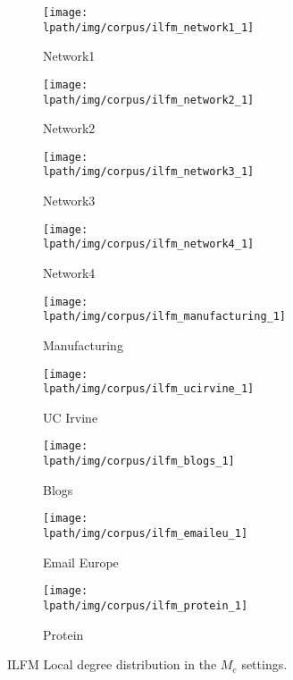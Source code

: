 
\begin{figure}[h]
        \centering
        \begin{subfigure}[b]{0.300\textwidth}
            \centering
            \texttt{[image: \\lpath/img/corpus/ilfm\_network1\_1]}
            \caption {{\small Network1}}    
        \end{subfigure}
        \begin{subfigure}[b]{0.300\textwidth}
            \centering
            \texttt{[image: \\lpath/img/corpus/ilfm\_network2\_1]}
            \caption {{\small Network2}}    
        \end{subfigure}
        \begin{subfigure}[b]{0.300\textwidth}
            \centering
            \texttt{[image: \\lpath/img/corpus/ilfm\_network3\_1]}
            \caption {{\small Network3}}    
        \end{subfigure}
        \begin{subfigure}[b]{0.300\textwidth}
            \centering
            \texttt{[image: \\lpath/img/corpus/ilfm\_network4\_1]}
            \caption {{\small Network4}}    
        \end{subfigure}
        \begin{subfigure}[b]{0.300\textwidth}
            \centering
            \texttt{[image: \\lpath/img/corpus/ilfm\_manufacturing\_1]}
            \caption {{\small Manufacturing}}    
        \end{subfigure}
        \begin{subfigure}[b]{0.300\textwidth}
            \centering
            \texttt{[image: \\lpath/img/corpus/ilfm\_ucirvine\_1]}
            \caption {{\small UC Irvine}}    
            \label{fig:mean and std of net14}
        \end{subfigure}
        \begin{subfigure}[b]{0.300\textwidth}
            \centering
            \texttt{[image: \\lpath/img/corpus/ilfm\_blogs\_1]}
            \caption {{\small Blogs}}    
            \label{fig:mean and std of net14}
        \end{subfigure}
        \begin{subfigure}[b]{0.300\textwidth}
            \centering
            \texttt{[image: \\lpath/img/corpus/ilfm\_emaileu\_1]}
            \caption {{\small Email Europe}}    
            \label{fig:mean and std of net14}
        \end{subfigure}
        \begin{subfigure}[b]{0.300\textwidth}
            \centering
            \texttt{[image: \\lpath/img/corpus/ilfm\_protein\_1]}
            \caption {{\small Protein}}    
            \label{fig:mean and std of net14}
        \end{subfigure}
        \caption{ILFM Local degree distribution in the $M_e$ settings. } 
        \label{fig:me_fit_lburst_ilfm}
\end{figure}
